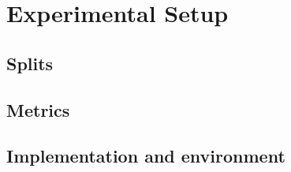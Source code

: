 \chapter{Experimental Setup}
\label{ch:experiments}

\section{Splits}

\section{Metrics}

\section{Implementation and environment}
